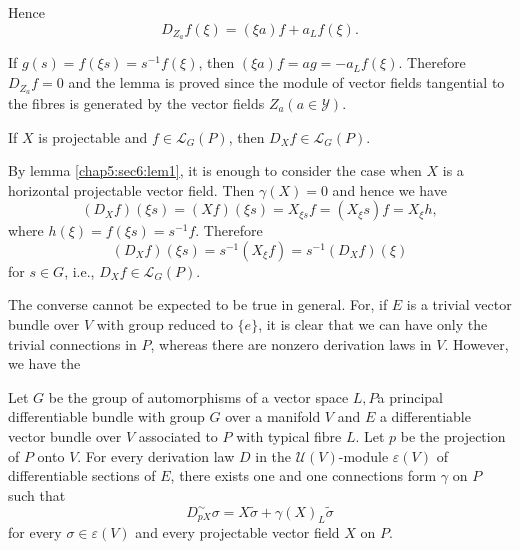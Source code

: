 Hence\pageoriginale
$$
D_{Z_a} f (\xi) =(\xi a) f + a_L f(\xi).
$$

If $g(s) = f (\xi s) = s^{-1}f (\xi)$, then $(\xi a) f = ag = - a_L f
(\xi)$. Therefore $D_{Z_a} f = 0$ and the lemma is proved since the
module of vector fields tangential to the fibres is generated by the
vector fields $Z_a (a \in \mathscr{Y})$. 

\begin{lem}\label{chap5:sec6:lem2}%
  If $X$ is projectable and $f \in \mathscr{L}_G (P)$, then $D_X f \in
  \mathscr{L}_G (P)$. 
\end{lem}

By lemma \ref{chap5:sec6:lem1}, it is enough to consider the case when $X$ is a
horizontal projectable vector field. Then $\gamma (X) = 0$ and hence
we have 
$$
(D_X f) (\xi s) = (X f) (\xi s) = X_{\xi s} f = (X_\xi s) f = X_\xi h ,
$$
where $h(\xi) = f(\xi s) = s^{-1} f$. Therefore
$$
(D_X f) (\xi s) = s^{-1} (X_\xi f) = s^{-1} (D_X f) (\xi)
$$
for $s \in G$, i.e., $D_X f \in \mathscr{L}_G (P)$.

The converse cannot be expected to be true in general. For, if $E$ is
a trivial vector bundle over $V$ with group reduced to $\{e\}$, it is
clear that we can have only the trivial connections in $P$, whereas
there are nonzero derivation laws in $V$. However, we have the  

\begin{theorem}\label{chap5:sec6:thm4}%
  Let $G$ be the group of automorphisms of a vector space $L, P$\pageoriginale a
  principal differentiable bundle with group $G$ over a manifold $V$
  and $E$ a differentiable vector bundle over $V$ associated to $P$
  with typical fibre $L$. Let $p$ be the projection of $P$ onto
  $V$. For every derivation law $D$ in the $\mathscr{U}(V)$-module
  $\varepsilon (V)$ of differentiable sections of $E$, there exists one
  and one connections form $\gamma$ on $P$ such that
  \begin{equation}
    D_{pX}^{\sim} \sigma = X \tilde{\sigma} + \gamma (X)_L \tilde{\sigma}\tag{C}
  \end{equation}
  for every $\sigma \in \varepsilon (V)$ and every projectable vector
  field $X$ on $P$. 
\end{theorem}

